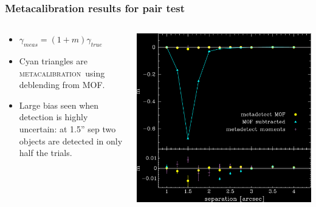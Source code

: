 \documentclass{beamer}
\newcommand{\mcal}{\textsc{metacalibration}}
\begin{document}
\begin{frame}
    \frametitle{Metacalibration results for pair test}

 
    \begin{columns}
        \begin{column}{0.4\textwidth}
            \begin{itemize}

                \item $\gamma_{meas} = (1+m) \gamma_{true}$

                \item Cyan triangles are \mcal\ using deblending from MOF.

                \item Large bias seen when detection is highly uncertain: at 1.5'' sep
                    two objects are detected in only half the trials.

            \end{itemize}
        \end{column}
        \begin{column}{0.6\textwidth}
            \begin{center}
                \includegraphics[width=\columnwidth]{pairs-mc-bdkpair-negate.png}
            \end{center}
        \end{column}
    \end{columns}
\end{frame}
\end{document}

